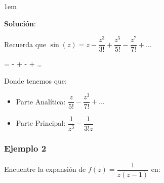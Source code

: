 \documentclass[12pt, fleqn]{report}                             %
\newenvironment{SmallIndentation}[1][0.75em]                    %
    {\begin{adjustwidth}{#1}{}\begin{footnotesize}}                 %
    {\end{footnotesize}\end{adjustwidth}}                           %
\newcommand{\Wrap}[1]{\left( #1 \right)}                        %
\newenvironment{MultiLineEquation*}[1]                          %
        {\begin{equation*}\begin{alignedat}{#1}}                    %
        {\end{alignedat}\end{equation*}}                            %
\newcommand{\Sin}[1]{\sin\Wrap{#1}}                             %
\begin{document}
                    \begin{SmallIndentation}[1em]
                        \textbf{Solución}:
                        
                        Recuerda que $\Sin{z} = z - \dfrac{z^3}{3!} + \dfrac{z^5}{5!} - 
                        \dfrac{z^7}{7!} + \dots$

                        \begin{MultiLineEquation*}{3}
                            \dfrac{\Sin{z}}{z^4} =  -  + 
                             -  + \dots
                        \end{MultiLineEquation*}

                        Donde tenemos que:
                        \begin{itemize}
                            \item Parte Analítica: $\dfrac{z}{5!} - \dfrac{z^3}{7!} + \dots$
                            \item Parte Principal: $\dfrac{1}{z^3} - \dfrac{1}{3!z}$
                        \end{itemize}
                            
                    \end{SmallIndentation}


                \subsubsection{Ejemplo 2}

                    Encuentre la expansión de $f(z) = \dfrac{1}{z(z-1)}$ en:
\end{document}
